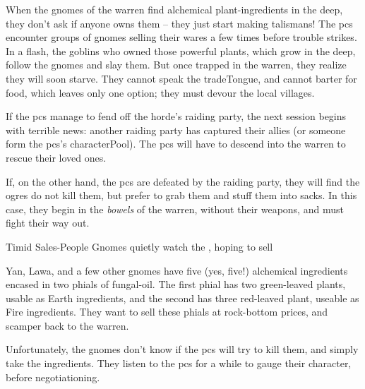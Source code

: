 
 
% 
% 
% 
% 
% 


\label{gnomeWarrenPrelude}

\noindent
When the gnomes of the \gls{warren} find alchemical plant-\glspl{ingredient} in the \gls{deep}, they don't ask if anyone owns them -- they just start making \glspl{talisman}!
The \glspl{pc} encounter groups of gnomes selling their wares a few times before trouble strikes.
In a flash, the goblins who owned those powerful plants, which grow in the \gls{deep}, follow the gnomes and slay them.
But once trapped in the \gls{warren}, they realize they will soon starve.
They cannot speak the \gls{tradeTongue}, and cannot barter for food, which leaves only one option; they must devour the local \glspl{village}.

If the \glspl{pc} manage to fend off the horde's raiding party, the next session begins with terrible news: another raiding party has captured their allies (or someone form the \glspl{pc}'s \gls{characterPool}).
The \glspl{pc} will have to descend into the warren to rescue their loved ones.

If, on the other hand, the \glspl{pc} are defeated by the raiding party, they will find the \glspl{ogre} do not kill them, but prefer to grab them and stuff them into sacks.
In this case, they begin in the \textit{bowels} of the \gls{warren}, without their weapons, and must fight their way out.

{Timid Sales-People}%
{Gnomes quietly watch the , hoping to sell }%

\begin{exampletext}
		Yan, Lawa, and a few other gnomes have five (yes, five!) alchemical \glspl{ingredient} encased in two phials of fungal-oil.
		The first phial has two green-leaved plants, usable as Earth \glspl{ingredient}, and the second has three red-leaved plant, useable as Fire \glspl{ingredient}.
		They want to sell these phials at rock-bottom prices, and scamper back to the \gls{warren}.

		Unfortunately, the gnomes don't know if the \glspl{pc} will try to kill them, and simply take the \glspl{ingredient}.
		They listen to the \glspl{pc} for a while to gauge their character, before negotiationing.

\end{exampletext}


